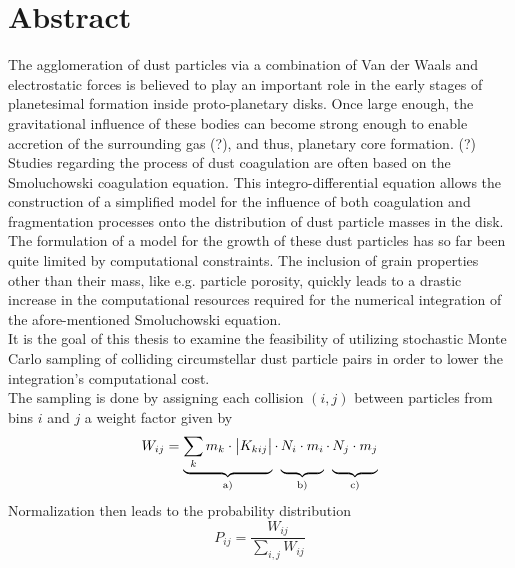 \chapter*{Abstract}

\thispagestyle{NoHeader}

The agglomeration of dust particles via a combination of Van der Waals and electrostatic forces
is believed to play an important role in the early stages of planetesimal formation inside 
proto-planetary disks. Once large enough, the gravitational influence of these bodies can 
become strong enough to enable accretion of the surrounding gas (?), and thus, planetary core
formation. (?) \\

Studies regarding the process of dust coagulation %
are often based on the Smoluchowski coagulation equation. %
This integro-differential equation allows the construction of a simplified model for the influence 
of both coagulation and fragmentation processes onto the distribution of dust particle masses in 
the disk. \\

The formulation of a model for the growth of these dust particles has so far been quite limited by
computational constraints. The inclusion of grain properties other than their mass, like e.g.
particle porosity, quickly leads to a drastic increase in the computational resources required for
the numerical integration of the afore-mentioned Smoluchowski equation. \\

It is the goal of this thesis to examine the feasibility of utilizing stochastic Monte Carlo 
sampling of colliding circumstellar dust particle pairs in order to lower the integration's 
computational cost. \\


The sampling is done by assigning each collision $(i,j)$ between particles from bins 
$i$ and $j$ a weight factor given by
\begin{equation}
    W_{ij}=
        \underbrace{
            \sum_k m_k\cdot\big|K_{kij}\big|
        }_\text{a)}
        \cdot
        \underbrace{
            N_i \cdot m_i
            \vphantom{\sum_k m_k\cdot\big|K_{kij}\big|}
        }_\text{b)}
        \cdot
        \underbrace{
            N_j \cdot m_j
            \vphantom{\sum_k m_k\cdot\big|K_{kij}\big|}
        }_\text{c)}
\end{equation}
Normalization then leads to the probability distribution
\begin{equation}
    P_{ij}=
        \frac{
            W_{ij}
        }{
            \sum_{i,j} W_{ij}
        }
\end{equation}


